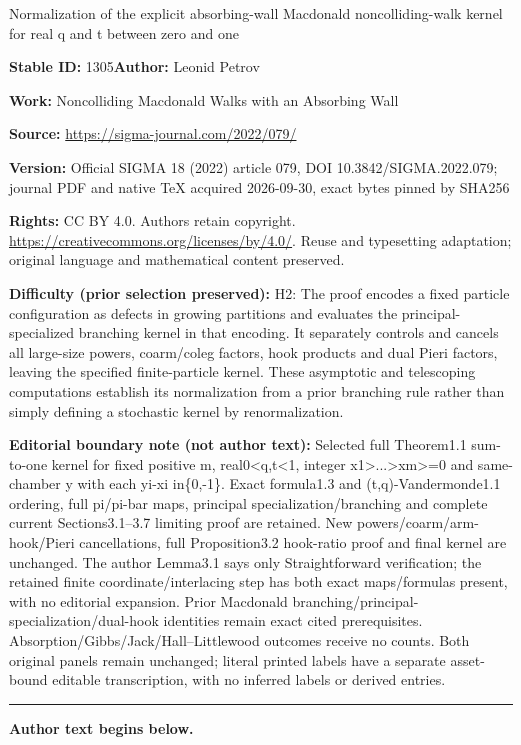 \documentclass[11pt]{article}
\numberwithin{equation}{section}
\numberwithin{equation}{section}
\begin{document}
\begin{center}\Large Normalization of the explicit absorbing-wall Macdonald noncolliding-walk kernel for real q and t between zero and one\end{center}
\noindent\textbf{Stable ID:} 1305\quad\textbf{Author:} Leonid Petrov\par
\noindent\textbf{Work:} Noncolliding Macdonald Walks with an Absorbing Wall\par
\noindent\textbf{Source:} \url{https://sigma-journal.com/2022/079/}\par
\noindent\textbf{Version:} Official SIGMA 18 (2022) article 079, DOI 10.3842/SIGMA.2022.079; journal PDF and native TeX acquired 2026-09-30, exact bytes pinned by SHA256\par
\noindent\textbf{Rights:} CC BY 4.0. Authors retain copyright. \url{https://creativecommons.org/licenses/by/4.0/}. Reuse and typesetting adaptation; original language and mathematical content preserved.\par
\noindent\textbf{Difficulty (prior selection preserved):} {\CJKfont H2: The proof encodes a fixed particle configuration as defects in growing partitions and evaluates the principal-specialized branching kernel in that encoding. It separately controls and cancels all large-size powers, coarm/coleg factors, hook products and dual Pieri factors, leaving the specified finite-particle kernel. These asymptotic and telescoping computations establish its normalization from a prior branching rule rather than simply defining a stochastic kernel by renormalization.}\par
\medskip\noindent\textbf{Editorial boundary note (not author text):} Selected full Theorem1.1 sum-to-one kernel for fixed positive m, real0<q,t<1, integer x1>...>xm>=0 and same-chamber y with each yi-xi in\{0,-1\}. Exact formula1.3 and (t,q)-Vandermonde1.1 ordering, full pi/pi-bar maps, principal specialization/branching and complete current Sections3.1–3.7 limiting proof are retained. New powers/coarm/arm-hook/Pieri cancellations, full Proposition3.2 hook-ratio proof and final kernel are unchanged. The author Lemma3.1 says only Straightforward verification; the retained finite coordinate/interlacing step has both exact maps/formulas present, with no editorial expansion. Prior Macdonald branching/principal-specialization/dual-hook identities remain exact cited prerequisites. Absorption/Gibbs/Jack/Hall–Littlewood outcomes receive no counts. Both original panels remain unchanged; literal printed labels have a separate asset-bound editable transcription, with no inferred labels or derived entries.\par
\medskip\hrule\medskip\noindent\textbf{Author text begins below.}\par
\setcounter{section}{1}\setcounter{subsection}{1}
\end{document}
